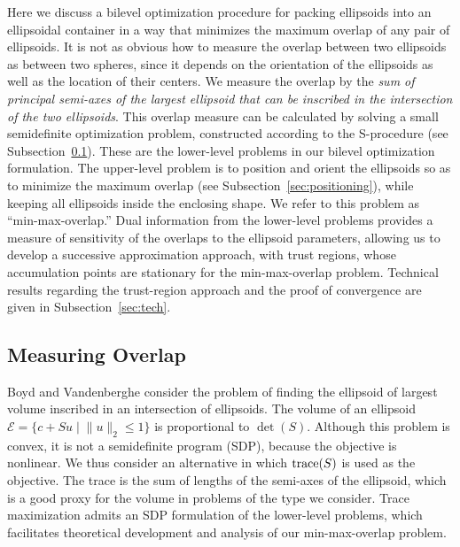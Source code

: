 \documentclass{siamltex}
\providecommand{\norm}[1]{\lVert#1\rVert}
\begin{document}
Here we discuss a bilevel optimization procedure for packing
ellipsoids into an ellipsoidal container in a way that minimizes the
maximum overlap of any pair of ellipsoids. It is not as obvious how to
measure the overlap between two ellipsoids as between two spheres,
since it depends on the orientation of the ellipsoids as well as the
location of their centers.  We measure the overlap by the {\em sum of
  principal semi-axes of the largest ellipsoid that can be inscribed
  in the intersection of the two ellipsoids}. This overlap measure can
be calculated by solving a small semidefinite optimization problem,
constructed according to the S-procedure (see
Subsection~\ref{sec:overlap}). These are the lower-level problems in
our bilevel optimization formulation. The upper-level problem is to
position and orient the ellipsoids so as to minimize the maximum
overlap (see Subsection~\ref{sec:positioning}), while keeping all
ellipsoids inside the enclosing shape. We refer to this problem as
``min-max-overlap.'' Dual information from the lower-level problems
provides a measure of sensitivity of the overlaps to the ellipsoid
parameters, allowing us to develop a successive approximation
approach, with trust regions, whose accumulation points are stationary
for the min-max-overlap problem. Technical results regarding the
trust-region approach and the proof of convergence are given in
Subsection~\ref{sec:tech}.

\subsection{Measuring Overlap}
\label{sec:overlap}

Boyd and Vandenberghe \cite[Section~8.4.2]{BoyV03} consider the
problem of finding the ellipsoid of largest volume inscribed in an
intersection of ellipsoids.  The volume of an ellipsoid $\mathcal{E} =
\{c + S u \mid \norm{u}_2 \leq 1 \}$ is proportional to
$\det(S)$. Although this problem is convex, it is not a semidefinite
program (SDP), because the objective is nonlinear. We thus consider an
alternative in which ${\mbox{\rm trace}} (S)$ is used as the objective. The trace
is the sum of lengths of the semi-axes of the ellipsoid, which is a
good proxy for the volume in problems of the type we consider. 
Trace maximization admits an SDP formulation of the lower-level
problems, which facilitates theoretical development and analysis of
our min-max-overlap problem.
\end{document}
